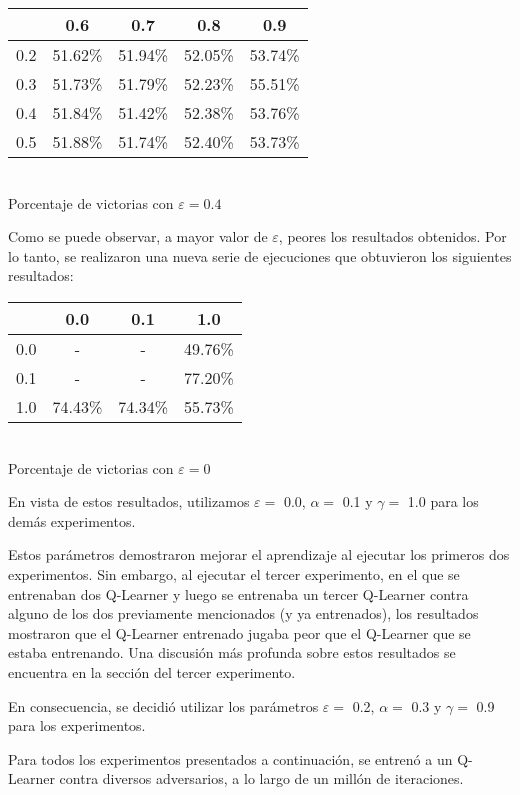 \begin{center}
\begin{tabular}{|c||c|c|c|c|}
	\hline
	\backslashbox{$\alpha$}{$\gamma$} & 0.6 & 0.7 & 0.8 & 0.9\\
	\hline
	\hline
	0.2 & 51.62\% & 51.94\% & 52.05\% & 53.74\% \\
	\hline
	0.3 & 51.73\% & 51.79\% & 52.23\% & 55.51\% \\
	\hline
	0.4 & 51.84\% & 51.42\% & 52.38\% & \cellcolor{intvier}53.76\% \\
	\hline
	0.5 & 51.88\% & 51.74\% & 52.40\% & 53.73\% \\
	\hline
\end{tabular}\\
Porcentaje de victorias con $\varepsilon=0.4$
\end{center}

Como se puede observar, a mayor valor de $\varepsilon$, peores los resultados obtenidos. Por lo tanto, se realizaron una nueva serie de ejecuciones que obtuvieron los siguientes resultados:
\begin{center}
\begin{tabular}{|c||c|c|c|}
	\hline
	\backslashbox{$\alpha$}{$\gamma$} & 0.0 & 0.1 & 1.0\\
	\hline
	\hline
	0.0 & - & - & 49.76\%\\
	\hline
	0.1 & - & - & \cellcolor{intvier}77.20\%\\
	\hline
	1.0 & 74.43\% & 74.34\% & 55.73\%\\
	\hline
\end{tabular}\\
Porcentaje de victorias con $\varepsilon=0$
\end{center}

En vista de estos resultados, utilizamos $\varepsilon = $ 0.0, $\alpha = $ 0.1 y $\gamma = $ 1.0 para los dem\'as experimentos.

Estos parámetros demostraron mejorar el aprendizaje al ejecutar los primeros dos experimentos. Sin embargo, al ejecutar el tercer experimento, en el que se entrenaban dos Q-Learner y luego se entrenaba un tercer Q-Learner contra alguno de los dos previamente mencionados (y ya entrenados), los resultados mostraron que el Q-Learner entrenado jugaba peor que el Q-Learner que se estaba entrenando. Una discusión más profunda sobre estos resultados se encuentra en la sección del tercer experimento.

En consecuencia, se decidió utilizar los parámetros $\varepsilon = $ 0.2, $\alpha = $ 0.3 y $\gamma = $ 0.9 para los experimentos.

Para todos los experimentos presentados a continuación, se entrenó a un Q-Learner contra diversos adversarios, a lo largo de un millón de iteraciones.






